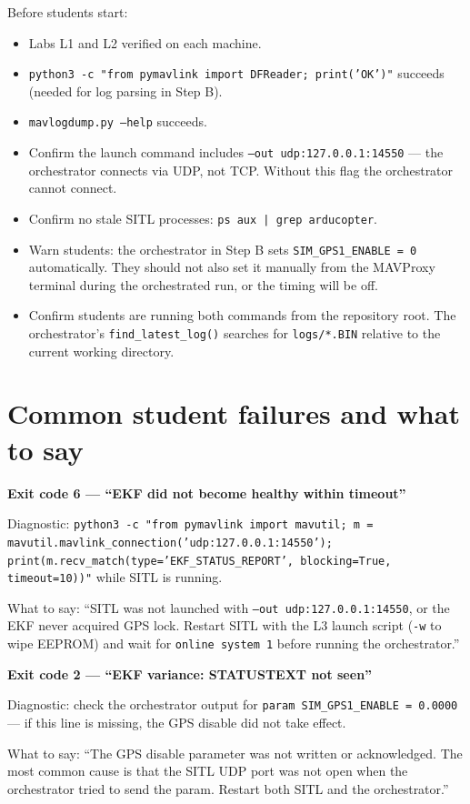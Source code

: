 \documentclass[a4paper,11pt,twoside]{article}
\begin{document}
Before students start:
\begin{itemize}[label={[ ]}]
  \item Labs L1 and L2 verified on each machine.
  \item \texttt{python3 -c "from pymavlink import DFReader; print('OK')"} succeeds (needed for log parsing in Step B).
  \item \texttt{mavlogdump.py --help} succeeds.
  \item Confirm the launch command includes \texttt{--out udp:127.0.0.1:14550} --- the orchestrator connects via UDP, not TCP. Without this flag the orchestrator cannot connect.
  \item Confirm no stale SITL processes: \texttt{ps aux | grep arducopter}.
  \item Warn students: the orchestrator in Step B sets \texttt{SIM\_GPS1\_ENABLE = 0} automatically. They should not also set it manually from the MAVProxy terminal during the orchestrated run, or the timing will be off.
  \item Confirm students are running both commands from the repository root. The orchestrator's \texttt{find\_latest\_log()} searches for \texttt{logs/*.BIN} relative to the current working directory.
\end{itemize}

\section*{Common student failures and what to say}

\textbf{Exit code 6 --- ``EKF did not become healthy within timeout''}

Diagnostic: \texttt{python3 -c "from pymavlink import mavutil; m = mavutil.mavlink\_connection('udp:127.0.0.1:14550'); print(m.recv\_match(type='EKF\_STATUS\_REPORT', blocking=True, timeout=10))"} while SITL is running.

What to say: ``SITL was not launched with \texttt{--out udp:127.0.0.1:14550}, or the EKF never acquired GPS lock. Restart SITL with the L3 launch script (\texttt{-w} to wipe EEPROM) and wait for \texttt{online system 1} before running the orchestrator.''

\textbf{Exit code 2 --- ``EKF variance: STATUSTEXT not seen''}

Diagnostic: check the orchestrator output for \texttt{param SIM\_GPS1\_ENABLE = 0.0000} --- if this line is missing, the GPS disable did not take effect.

What to say: ``The GPS disable parameter was not written or acknowledged. The most common cause is that the SITL UDP port was not open when the orchestrator tried to send the param. Restart both SITL and the orchestrator.''
\end{document}

